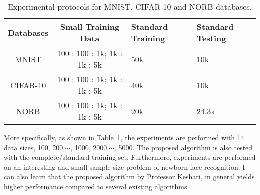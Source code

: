 \documentclass[twocolumn]{article}
\begin{document}
  \begin{table}[htbp]
  \centering
  \caption{Experimental protocols for MNIST, CIFAR-10 and NORB databases.}\label{table1}
  \begin{tabular}{|c|c|p{1.5cm}|p{1.5cm}|}
  \hline
  Databases & Small Training Data & Standard Training & Standard Testing \\
  \hline
  MNIST & 100 : 100 : 1k; 1k : 1k : 5k & 50k & 10k \\
  \hline
  CIFAR-10 & 100 : 100 : 1k; 1k : 1k : 5k & 40k & 10k \\
  \hline
  NORB & 100 : 100 : 1k; 1k : 1k : 5k & 20k & 24.3k \\
  \hline
  \end{tabular}
  \end{table}
    More specifically, as shown in Table~\ref{table1}, the experiments are performed with 14 data sizes, 100, 200,$\cdots$, 1000, 2000,$\cdots$, 5000. The proposed algorithm is also tested with the complete/standard training set. Furthermore, experiments are performed on an interesting and small sample size problem of newborn face recognition. I can also learn that the proposed algorithm by Professor Keshari, in general yields higher performance compared to several existing algorithms.

	
\end{document}
